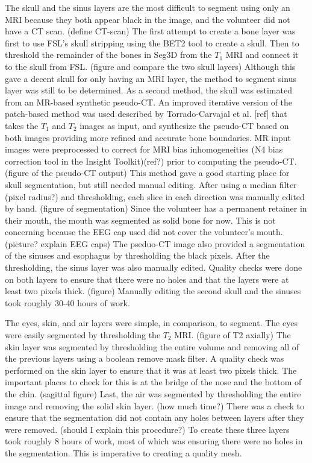 The skull and the sinus layers are the most difficult to segment using only an MRI because they both appear black in the image, and the volunteer did not have a CT scan. (define CT-scan) The first attempt to create a bone layer was first to use FSL's skull stripping using the BET2 tool to create a skull. Then to threshold the remainder of the bones in Seg3D from the $T_1$ MRI and connect it to the skull from FSL. (figure and compare the two skull layers) Although this gave a decent skull for only having an MRI layer, the method to segment sinus layer was still to be determined. As a second method, the skull was estimated from an MR-based synthetic pseudo-CT. An improved iterative version of the patch-based method was used described by Torrado-Carvajal et al. [ref] that takes the $T_1$ and $T_2$ images as input, and synthesize the pseudo-CT based on both images providing more refined and accurate bone boundaries. MR input images were preprocessed to correct for MRI bias inhomogeneities (N4 bias correction tool in the Insight Toolkit)(ref?) prior to computing the pseudo-CT. (figure of the pseudo-CT output) This method gave a good starting place for skull segmentation, but still needed manual editing. After using a median filter (pixel radius?) and thresholding, each slice in each direction was manually edited by hand. (figure of segmentation) Since the volunteer has a permanent retainer in their mouth, the mouth was segmented as solid bone for now. This is not concerning because the EEG cap used did not cover the volunteer's mouth. (picture? explain EEG caps) The pseduo-CT image also provided a segmentation of the sinuses and esophagus by thresholding the black pixels. After the thresholding, the sinus layer was also manually edited. Quality checks were done on both layers to ensure that there were no holes and that the layers were at least two pixels thick. (figure) Manually editing the second skull and the sinuses took roughly 30-40 hours of work. 

The eyes, skin, and air layers were simple, in comparison, to segment. The eyes were easily segmented by thresholding the $T_2$ MRI. (figure of T2 axially) The skin layer was segmented by thresholding the entire volume and removing all of the previous layers using a boolean remove mask filter. A quality check was performed on the skin layer to ensure that it was at least two pixels thick. The important places to check for this is at the bridge of the nose and the bottom of the chin. (sagittal figure) Last, the air was segmented by thresholding the entire image and removing the solid skin layer. (how much time?) There was a check to ensure that the segmentation did not contain any holes between layers after they were removed. (should I explain this procedure?) To create these three layers took roughly 8 hours of work, most of which was ensuring there were no holes in the segmentation. This is imperative to creating a quality mesh.

